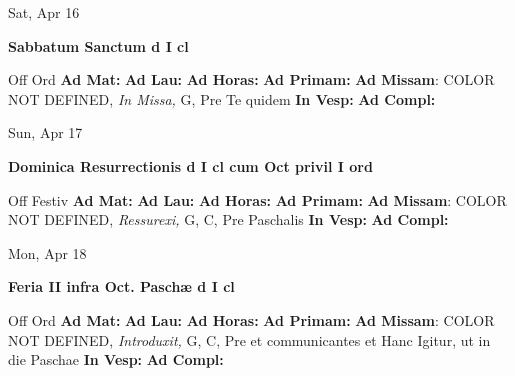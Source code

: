 \documentclass[10pt]{memoir}
\begin{document}
\begin{center}
\begin{minipage}{3.5in}
\vspace{2em}
\begin{center}Sat, Apr 16
\end{center}
\textbf{ \large Sabbatum Sanctum
\textnormal{\normalsize d I cl}}

\begin{justify}Off Ord
\textbf{Ad Mat: }
\textbf{Ad Lau: }
\textbf{Ad Horas: }
\textbf{Ad Primam: }\textbf{Ad Missam}: COLOR NOT DEFINED, \textit{In Missa,} G, Pre Te quidem
\textbf{In Vesp: }
\textbf{Ad Compl: }
\end{justify}
\end{minipage}
\end{center}

\begin{center}
\begin{minipage}{3.5in}
\vspace{2em}
\begin{center}Sun, Apr 17
\end{center}
\textbf{ \large Dominica Resurrectionis
\textnormal{\normalsize d I cl cum Oct privil I ord}}

\begin{justify}Off Festiv
\textbf{Ad Mat: }
\textbf{Ad Lau: }
\textbf{Ad Horas: }
\textbf{Ad Primam: }\textbf{Ad Missam}: COLOR NOT DEFINED, \textit{Ressurexi,} G, C, Pre Paschalis
\textbf{In Vesp: }
\textbf{Ad Compl: }
\end{justify}
\end{minipage}
\end{center}

\begin{center}
\begin{minipage}{3.5in}
\vspace{2em}
\begin{center}Mon, Apr 18
\end{center}
\textbf{ \large Feria II infra Oct. Paschæ
\textnormal{\normalsize d I cl}}

\begin{justify}Off Ord
\textbf{Ad Mat: }
\textbf{Ad Lau: }
\textbf{Ad Horas: }
\textbf{Ad Primam: }\textbf{Ad Missam}: COLOR NOT DEFINED, \textit{Introduxit,} G, C, Pre et communicantes et Hanc Igitur, ut in die Paschae
\textbf{In Vesp: }
\textbf{Ad Compl: }
\end{justify}
\end{minipage}
\end{center}
\end{document}
